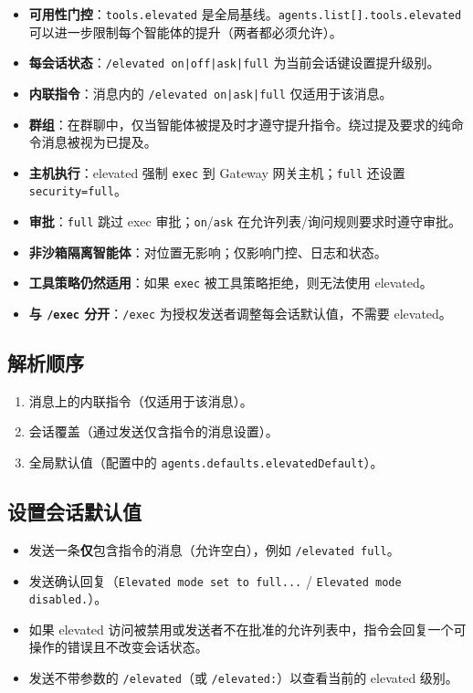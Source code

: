 \begin{itemize}
  \item \textbf{可用性门控}：\texttt{tools.elevated} 是全局基线。\texttt{agents.list[].tools.elevated} 可以进一步限制每个智能体的提升（两者都必须允许）。
  \item \textbf{每会话状态}：\texttt{/elevated on|off|ask|full} 为当前会话键设置提升级别。
  \item \textbf{内联指令}：消息内的 \texttt{/elevated on|ask|full} 仅适用于该消息。
  \item \textbf{群组}：在群聊中，仅当智能体被提及时才遵守提升指令。绕过提及要求的纯命令消息被视为已提及。
  \item \textbf{主机执行}：elevated 强制 \texttt{exec} 到 Gateway 网关主机；\texttt{full} 还设置 \texttt{security=full}。
  \item \textbf{审批}：\texttt{full} 跳过 exec 审批；\texttt{on}/\texttt{ask} 在允许列表/询问规则要求时遵守审批。
  \item \textbf{非沙箱隔离智能体}：对位置无影响；仅影响门控、日志和状态。
  \item \textbf{工具策略仍然适用}：如果 \texttt{exec} 被工具策略拒绝，则无法使用 elevated。
  \item \textbf{与 \texttt{/exec} 分开}：\texttt{/exec} 为授权发送者调整每会话默认值，不需要 elevated。
\end{itemize}


\subsection{解析顺序}


\begin{enumerate}
  \item 消息上的内联指令（仅适用于该消息）。
  \item 会话覆盖（通过发送仅含指令的消息设置）。
  \item 全局默认值（配置中的 \texttt{agents.defaults.elevatedDefault}）。
\end{enumerate}


\subsection{设置会话默认值}


\begin{itemize}
  \item 发送一条\textbf{仅}包含指令的消息（允许空白），例如 \texttt{/elevated full}。
  \item 发送确认回复（\texttt{Elevated mode set to full...} / \texttt{Elevated mode disabled.}）。
  \item 如果 elevated 访问被禁用或发送者不在批准的允许列表中，指令会回复一个可操作的错误且不改变会话状态。
  \item 发送不带参数的 \texttt{/elevated}（或 \texttt{/elevated:}）以查看当前的 elevated 级别。
\end{itemize}


